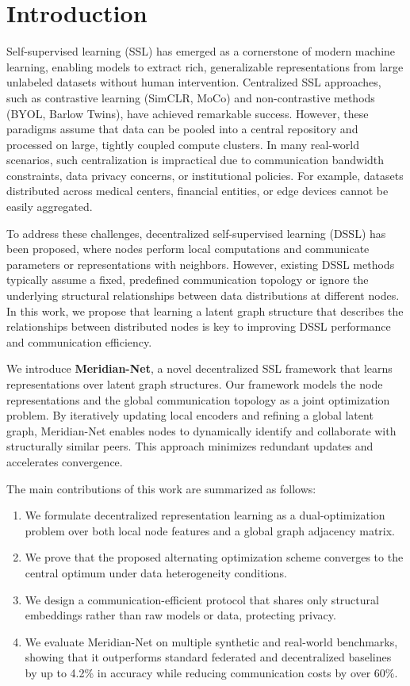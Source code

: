\section{Introduction}
Self-supervised learning (SSL) has emerged as a cornerstone of modern machine learning, enabling models to extract rich, generalizable representations from large unlabeled datasets without human intervention. Centralized SSL approaches, such as contrastive learning (SimCLR, MoCo) and non-contrastive methods (BYOL, Barlow Twins), have achieved remarkable success. However, these paradigms assume that data can be pooled into a central repository and processed on large, tightly coupled compute clusters. In many real-world scenarios, such centralization is impractical due to communication bandwidth constraints, data privacy concerns, or institutional policies. For example, datasets distributed across medical centers, financial entities, or edge devices cannot be easily aggregated.

To address these challenges, decentralized self-supervised learning (DSSL) has been proposed, where nodes perform local computations and communicate parameters or representations with neighbors. However, existing DSSL methods typically assume a fixed, predefined communication topology or ignore the underlying structural relationships between data distributions at different nodes. In this work, we propose that learning a latent graph structure that describes the relationships between distributed nodes is key to improving DSSL performance and communication efficiency.

We introduce \textbf{Meridian-Net}, a novel decentralized SSL framework that learns representations over latent graph structures. Our framework models the node representations and the global communication topology as a joint optimization problem. By iteratively updating local encoders and refining a global latent graph, Meridian-Net enables nodes to dynamically identify and collaborate with structurally similar peers. This approach minimizes redundant updates and accelerates convergence.

The main contributions of this work are summarized as follows:
\begin{enumerate}[label=\lbrack\arabic*\rbrack]
  \item We formulate decentralized representation learning as a dual-optimization problem over both local node features and a global graph adjacency matrix.
  \item We prove that the proposed alternating optimization scheme converges to the central optimum under data heterogeneity conditions.
  \item We design a communication-efficient protocol that shares only structural embeddings rather than raw models or data, protecting privacy.
  \item We evaluate Meridian-Net on multiple synthetic and real-world benchmarks, showing that it outperforms standard federated and decentralized baselines by up to 4.2\% in accuracy while reducing communication costs by over 60\%.
\end{enumerate}
